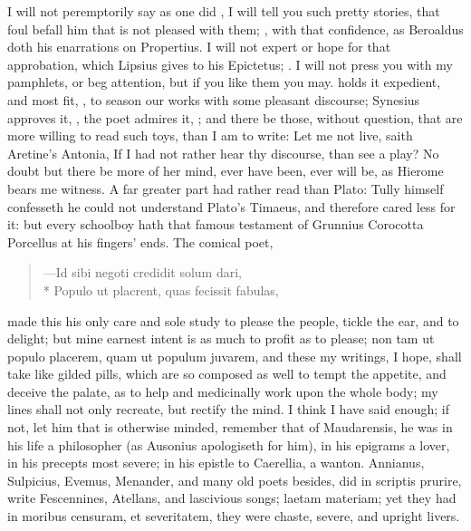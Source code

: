 {I will not peremptorily say as one did , I will tell you such pretty
stories, that foul befall him that is not pleased with them; , with
that confidence, as Beroaldus doth his enarrations on Propertius. I
will not expert or hope for that approbation, which Lipsius gives to
his Epictetus; . I will not
press you with my pamphlets, or beg attention, but if you
like them you may. \Pliny{} holds it expedient, and most fit, , to season our works with some
pleasant discourse; Synesius approves it, , the
poet admires it, ; and
there be those, without question, that are more willing to read such
toys, than I am to write: Let me not live, saith Aretine's
Antonia, If I had not rather hear thy discourse, than see a play?
No doubt but there be more of her mind, ever have been, ever will be,
as Hierome bears me witness. A far greater part had rather read
\Apuleius than Plato: Tully himself confesseth he could not understand
Plato's Timaeus, and therefore cared less for it: but every schoolboy
hath that famous testament of Grunnius Corocotta Porcellus at his
fingers' ends. The comical poet,

\begin{latin}
\begin{verse}
---Id sibi negoti credidit solum dari,\\*
Populo ut placrent, quas fecissit fabulas,
\end{verse}
\end{latin}

made this his only care and sole study to please the people, tickle the
ear, and to delight; but mine earnest intent is as much to profit as to
please; non tam ut populo placerem, quam ut populum juvarem, and these
my writings, I hope, shall take like gilded pills, which are so
composed as well to tempt the appetite, and deceive the palate, as to
help and medicinally work upon the whole body; my lines shall not only
recreate, but rectify the mind. I think I have said enough; if not, let
him that is otherwise minded, remember that of Maudarensis, he
was in his life a philosopher (as Ausonius apologiseth for him), in his
epigrams a lover, in his precepts most severe; in his epistle to
Caerellia, a wanton. Annianus, Sulpicius, Evemus, Menander, and many
old poets besides, did in scriptis prurire, write Fescennines,
Atellans, and lascivious songs; laetam materiam; yet they had in
moribus censuram, et severitatem, they were chaste, severe, and upright
livers.

}
